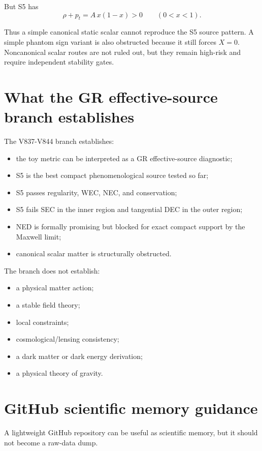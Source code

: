 \documentclass[11pt,a4paper]{article}
\begin{document}
But S5 has
\begin{equation}
\rho+p_t=A\,x(1-x)>0\qquad (0<x<1).
\end{equation}

Thus a simple canonical static scalar cannot reproduce the S5 source pattern. A simple phantom sign variant is also obstructed because it still forces $X=0$. Noncanonical scalar routes are not ruled out, but they remain high-risk and require independent stability gates.

\section{What the GR effective-source branch establishes}

The V837-V844 branch establishes:

\begin{itemize}
\item the toy metric can be interpreted as a GR effective-source diagnostic;
\item S5 is the best compact phenomenological source tested so far;
\item S5 passes regularity, WEC, NEC, and conservation;
\item S5 fails SEC in the inner region and tangential DEC in the outer region;
\item NED is formally promising but blocked for exact compact support by the Maxwell limit;
\item canonical scalar matter is structurally obstructed.
\end{itemize}

The branch does not establish:

\begin{itemize}
\item a physical matter action;
\item a stable field theory;
\item local constraints;
\item cosmological/lensing consistency;
\item a dark matter or dark energy derivation;
\item a physical theory of gravity.
\end{itemize}

\section{GitHub scientific memory guidance}

A lightweight GitHub repository can be useful as scientific memory, but it should not become a raw-data dump.
\end{document}
